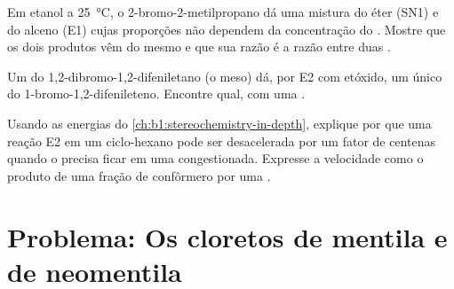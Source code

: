 \begin{exercise}[$\star\star\star$]\label{exo:b1:elimination:10}
Em etanol a \qty{25}{\celsius}, o 2-bromo-2-metilpropano dá uma mistura
do éter (SN1) e do alceno (E1) cujas proporções não dependem da
concentração do . Mostre que os dois produtos vêm do mesmo
 e que sua razão é a razão entre duas .
\end{exercise}

\begin{exercise}[$\star\star\star$]\label{exo:b1:elimination:11}
Um  do 1,2-dibromo-1,2-difeniletano (o meso) dá, por E2
com etóxido, um único  do 1-bromo-1,2-difenileteno.
Encontre qual, com uma .
\end{exercise}

\begin{exercise}[$\star\star\star$]\label{exo:b1:elimination:12}
Usando as energias do \cref{ch:b1:stereochemistry-in-depth}, explique por
que uma reação E2 em um ciclo-hexano pode ser desacelerada por um fator
de centenas quando o  precisa ficar  em uma 
congestionada. Expresse a velocidade como o produto de uma fração de
confôrmero por uma .
\end{exercise}

\section{Problema: Os cloretos de mentila e de neomentila}

